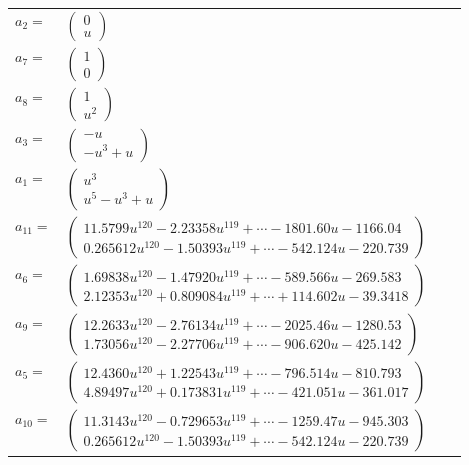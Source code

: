 \documentclass[1p]{elsarticle_modified}
\theoremstyle{definition}
\begin{document}
\begin{tabular}{m{7pt} m{180pt} m{7pt} m{180pt} }
\flushright $a_{2}=$&$\begin{pmatrix}0\\u\end{pmatrix}$ \\
\flushright $a_{7}=$&$\begin{pmatrix}1\\0\end{pmatrix}$ \\
\flushright $a_{8}=$&$\begin{pmatrix}1\\u^2\end{pmatrix}$ \\
\flushright $a_{3}=$&$\begin{pmatrix}- u\\- u^3+u\end{pmatrix}$ \\
\flushright $a_{1}=$&$\begin{pmatrix}u^3\\u^5- u^3+u\end{pmatrix}$ \\
\flushright $a_{11}=$&$\begin{pmatrix}11.5799 u^{120}-2.23358 u^{119}+\cdots-1801.60 u-1166.04\\0.265612 u^{120}-1.50393 u^{119}+\cdots-542.124 u-220.739\end{pmatrix}$ \\
\flushright $a_{6}=$&$\begin{pmatrix}1.69838 u^{120}-1.47920 u^{119}+\cdots-589.566 u-269.583\\2.12353 u^{120}+0.809084 u^{119}+\cdots+114.602 u-39.3418\end{pmatrix}$ \\
\flushright $a_{9}=$&$\begin{pmatrix}12.2633 u^{120}-2.76134 u^{119}+\cdots-2025.46 u-1280.53\\1.73056 u^{120}-2.27706 u^{119}+\cdots-906.620 u-425.142\end{pmatrix}$ \\
\flushright $a_{5}=$&$\begin{pmatrix}12.4360 u^{120}+1.22543 u^{119}+\cdots-796.514 u-810.793\\4.89497 u^{120}+0.173831 u^{119}+\cdots-421.051 u-361.017\end{pmatrix}$ \\
\flushright $a_{10}=$&$\begin{pmatrix}11.3143 u^{120}-0.729653 u^{119}+\cdots-1259.47 u-945.303\\0.265612 u^{120}-1.50393 u^{119}+\cdots-542.124 u-220.739\end{pmatrix}$ \\

\end{tabular}
\end{document}
